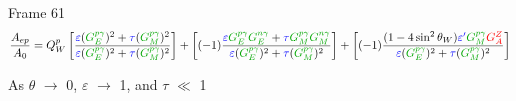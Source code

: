 \documentclass[xcolor=x11names,compress,8pt]{beamer}
\renewcommand{\(}{\begin{columns}}
\renewcommand{\)}{\end{columns}}
\newcommand{\<}[1]{\begin{column}{#1}}
\renewcommand{\>}{\end{column}}
\begin{document}
\begin{frame}{Frame 61}
\begin{equation} \label{equ:qweak5}
\frac{A_{ep}}{A_{0}} = Q_{W}^{p}\left[ \frac{\textcolor{blue}{\varepsilon}(\textcolor{darkgreen}{G_{E}^{p\gamma}})^{2} + \textcolor{blue}{\tau}(\textcolor{darkgreen}{G_{M}^{p\gamma}})^{2} }{ \textcolor{blue}{\varepsilon}(\textcolor{darkgreen}{G_{E}^{p\gamma}})^{2} + \textcolor{blue}{\tau}(\textcolor{darkgreen}{G_{M}^{p\gamma}})^{2} } \right] + \left[(-1)\frac{\textcolor{blue}{\varepsilon}\textcolor{darkgreen}{G_{E}^{p\gamma}}\textcolor{darkgreen}{G_{E}^{n\gamma}} + \textcolor{blue}{\tau}\textcolor{darkgreen}{G_{M}^{p\gamma}}\textcolor{darkgreen}{G_{M}^{n\gamma}} }{ \textcolor{blue}{\varepsilon}(\textcolor{darkgreen}{G_{E}^{p\gamma}})^{2} + \textcolor{blue}{\tau}(\textcolor{darkgreen}{G_{M}^{p\gamma}})^{2} } \right]  + \left[(-1)\frac{(1-4\sin^{2}\theta_{W})\textcolor{blue}{\varepsilon^{\prime}}\textcolor{darkgreen}{G_{M}^{p\gamma}}\textcolor{red}{G_{A}^{Z}} }{ \textcolor{blue}{\varepsilon}(\textcolor{darkgreen}{G_{E}^{p\gamma}})^{2} + \textcolor{blue}{\tau}(\textcolor{darkgreen}{G_{M}^{p\gamma}})^{2} } \right]
\end{equation}

\fontsize{6pt}{7.2}\selectfont

As $\theta$ $\rightarrow$ 0, $\varepsilon$ $\rightarrow$ 1, and $\tau$ $\ll$ 1


\end{frame}
\end{document}
